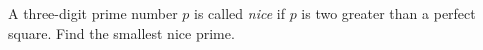 A three-digit prime number $p$ is called \emph{nice} if $p$ is two greater than a perfect square. Find the smallest nice prime.
